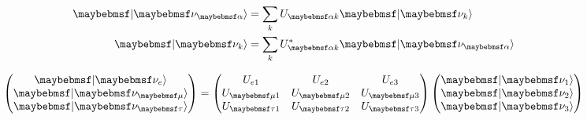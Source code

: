 \begin{align} %
    \ket{\nu_{\alpha}} & = \sum_{k}U_{\alpha k} \ket{\nu_{k}}          \\
    \ket{\nu_{k}}      & = \sum_{k}U_{\alpha k}^{*} \ket{\nu_{\alpha}}
\end{align} %

\begin{gather} %
    \begin{pmatrix}
        \ket{\nu_{e}}   \\
        \ket{\nu_{\mu}} \\
        \ket{\nu_{\tau}}
    \end{pmatrix}
    =
    \begin{pmatrix}
        U_{e1}     & U_{e2}     & U_{e3}     \\
        U_{\mu 1}  & U_{\mu 2}  & U_{\mu 3}  \\
        U_{\tau 1} & U_{\tau 2} & U_{\tau 3}
    \end{pmatrix}
    \begin{pmatrix}
        \ket{\nu_{1}} \\
        \ket{\nu_{2}} \\
        \ket{\nu_{3}}
    \end{pmatrix}
\end{gather} %

